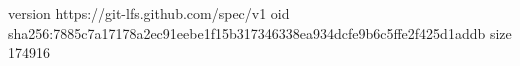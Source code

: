 version https://git-lfs.github.com/spec/v1
oid sha256:7885c7a17178a2ec91eebe1f15b317346338ea934dcfe9b6c5ffe2f425d1addb
size 174916
